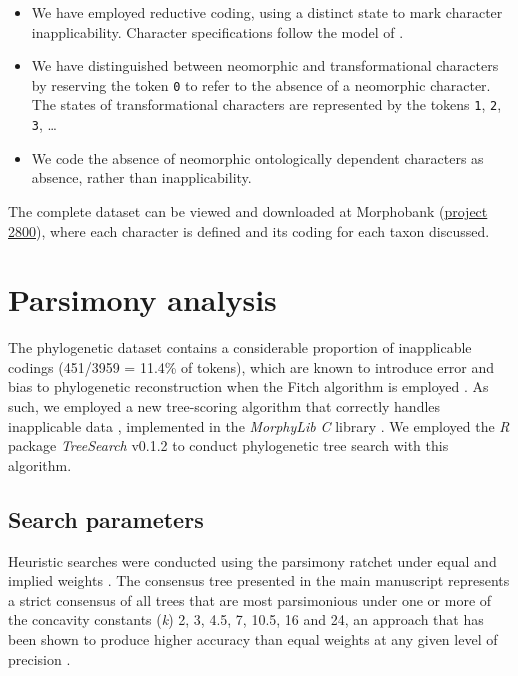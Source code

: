 \documentclass[]{book}
\theoremstyle{definition}
\theoremstyle{definition}
\theoremstyle{definition}
\theoremstyle{remark}
\begin{document}
\begin{itemize}
\item
  We have employed reductive coding, using a distinct state to mark
  character inapplicability. Character specifications follow the model
  of \citet{Sereno2007}.
\item
  We have distinguished between neomorphic and transformational
  characters \citep[sensu][]{Sereno2007} by reserving the token
  \texttt{0} to refer to the absence of a neomorphic character. The
  states of transformational characters are represented by the tokens
  \texttt{1}, \texttt{2}, \texttt{3}, \ldots{}
\item
  We code the absence of neomorphic ontologically dependent characters
  \citep[sensu][]{Vogt2017} as absence, rather than inapplicability.
\end{itemize}

The complete dataset can be viewed and downloaded at Morphobank
(\href{https://morphobank.org/permalink/?P2800}{project 2800}), where
each character is defined and its coding for each taxon discussed.

\hypertarget{treesearch}{%
\chapter{Parsimony analysis}\label{treesearch}}

The phylogenetic dataset contains a considerable proportion of
inapplicable codings (451/3959 = 11.4\% of tokens), which are known to
introduce error and bias to phylogenetic reconstruction when the Fitch
algorithm is employed \citep{Maddison1993, Brazeau2018}. As such, we
employed a new tree-scoring algorithm that correctly handles
inapplicable data \citep{Brazeau2018}, implemented in the
\emph{MorphyLib} \emph{C} library \citep{Brazeau2017Morphylib}. We
employed the \emph{R} package \emph{TreeSearch} v0.1.2
\citep{Smith2018TreeSearch} to conduct phylogenetic tree search with
this algorithm.

\hypertarget{search-parameters}{%
\section{Search parameters}\label{search-parameters}}

Heuristic searches were conducted using the parsimony ratchet
\citep{Nixon1999} under equal and implied weights \citep{Goloboff1997}.
The consensus tree presented in the main manuscript represents a strict
consensus of all trees that are most parsimonious under one or more of
the concavity constants (\emph{k}) 2, 3, 4.5, 7, 10.5, 16 and 24, an
approach that has been shown to produce higher accuracy than equal
weights at any given level of precision \citep{Smith2017}.
\end{document}
